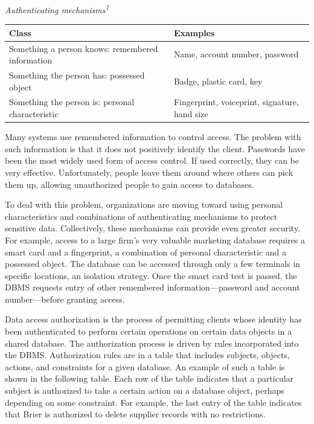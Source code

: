 \documentclass[
]{article}
\begin{document}
\emph{Authenticating mechanisms\textsuperscript{1}}

\begin{longtable}[]{@{}
  >{\raggedright\arraybackslash}p{}
  >{\raggedright\arraybackslash}p{}@{}}
\toprule
Class & Examples \\
\midrule
\endhead
Something a person knows: remembered information & Name, account number, password \\
Something the person has: possessed object & Badge, plastic card, key \\
Something the person is: personal characteristic & Fingerprint, voiceprint, signature, hand size \\
\bottomrule
\end{longtable}

Many systems use remembered information to control access. The problem
with such information is that it does not positively identify the
client. Passwords have been the most widely used form of access control.
If used correctly, they can be very effective. Unfortunately, people
leave them around where others can pick them up, allowing unauthorized
people to gain access to databases.

To deal with this problem, organizations are moving toward using
personal characteristics and combinations of authenticating mechanisms
to protect sensitive data. Collectively, these mechanisms can provide
even greater security. For example, access to a large firm's very
valuable marketing database requires a smart card and a fingerprint, a
combination of personal characteristic and a possessed object. The
database can be accessed through only a few terminals in specific
locations, an isolation strategy. Once the smart card test is passed,
the DBMS requests entry of other remembered information---password and
account number---before granting access.

Data access authorization is the process of permitting clients whose
identity has been authenticated to perform certain operations on certain
data objects in a shared database. The authorization process is driven
by rules incorporated into the DBMS. Authorization rules are in a table
that includes subjects, objects, actions, and constraints for a given
database. An example of such a table is shown in the following table.
Each row of the table indicates that a particular subject is authorized
to take a certain action on a database object, perhaps depending on some
constraint. For example, the last entry of the table indicates that
Brier is authorized to delete supplier records with no restrictions.
\end{document}
